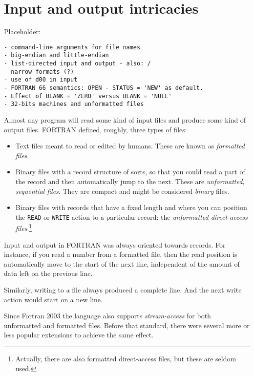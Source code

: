 \section{Input and output intricacies}
Placeholder:
\begin{verbatim}
- command-line arguments for file names
- big-endian and little-endian
- list-directed input and output - also: /
- narrow formats (?)
- use of d00 in input
- FORTRAN 66 semantics: OPEN - STATUS = 'NEW' as default.
- Effect of BLANK = 'ZERO' versus BLANK = 'NULL'
- 32-bits machines and unformatted files
\end{verbatim}

Almost any program will read some kind of input files and produce some kind of
output files. FORTRAN defined, roughly, three types of files:
\begin{itemize}
\item
Text files meant to read or edited by humans. These are known as \emph{formatted files}.
\item
Binary files with a record structure of sorts, so that you could read a part of the
record and then automatically jump to the next. These are \emph{unformatted, sequential files}.
They are compact and might be considered \emph{binary} files.
\item
Binary files with records that have a fixed length and where you can position the \verb+READ+
or \verb+WRITE+ action to a particular record: the \emph{unformatted direct-access files}.\footnote{
Actually, there are also formatted direct-access files, but these are seldom used.}
\end{itemize}

Input and output in FORTRAN was always oriented towards records. For instance, if you read a number
from a formatted file, then the read position is automatically move to the start of the next line,
independent of the amount of data left on the previous line.

Similarly, writing to a file always produced a complete line. And the next write action would start
on a new line.

Since Fortran 2003 the language also supports \emph{stream-access} for both unformatted and formatted
files. Before that standard, there were several more or less popular extensions to achieve the same
effect.


